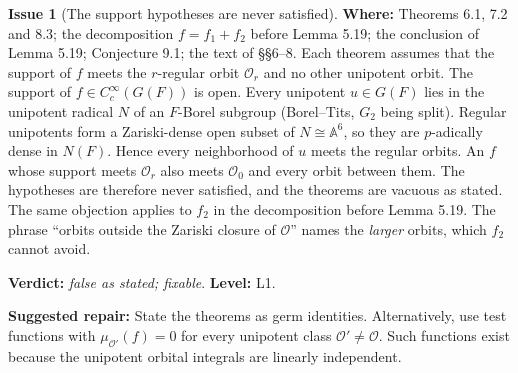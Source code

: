 \documentclass[12pt,letterpaper]{article}
\newcommand{\cO}{\mathcal{O}}
\newcommand{\Lv}[1]{\textsf{L#1}}
\newcommand{\verdict}[1]{\textbf{Verdict:} \emph{#1}.}
\newcommand{\level}[1]{\textbf{Level:} #1.}
\newcommand{\loc}[1]{\textbf{Where:} #1.}
\newcommand{\fix}[1]{\textbf{Suggested repair:} #1}
\theoremstyle{definition}
\newtheorem{issue}{Issue}[section]
\begin{document}
\begin{issue}[The support hypotheses are never satisfied]\label{iss:support}
\loc{Theorems 6.1, 7.2 and 8.3; the decomposition $f=f_1+f_2$ before Lemma
5.19; the conclusion of Lemma 5.19; Conjecture 9.1; the text of \S\S6--8}
Each theorem assumes that the support of $f$ meets the $r$-regular orbit
$\cO_r$ and no other unipotent orbit. The support of $f\in C_c^\infty(G(F))$
is open. Every unipotent $u\in G(F)$ lies in the unipotent radical $N$ of an
$F$-Borel subgroup (Borel--Tits, $G_2$ being split). Regular unipotents form
a Zariski-dense open subset of $N\cong\mathbb A^6$, so they are $p$-adically
dense in $N(F)$. Hence every neighborhood of $u$ meets the regular orbits. An
$f$ whose support meets $\cO_r$ also meets $\cO_0$ and every orbit between
them. The hypotheses are therefore never satisfied, and the theorems are
vacuous as stated. The same objection applies to $f_2$ in the decomposition
before Lemma 5.19. The phrase ``orbits outside the Zariski closure of $\cO$''
names the \emph{larger} orbits, which $f_2$ cannot avoid.

\verdict{false as stated; fixable}
\level{\Lv{1}}

\fix{State the theorems as germ identities. Alternatively, use test functions
with $\mu_{\cO'}(f)=0$ for every unipotent class $\cO'\neq\cO$. Such functions
exist because the unipotent orbital integrals are linearly independent.}
\end{issue}
\end{document}
